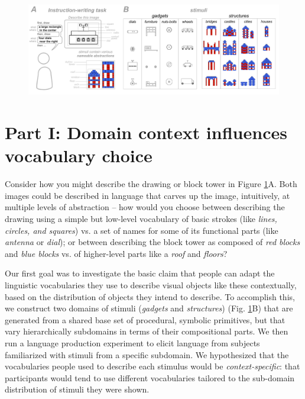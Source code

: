 \documentclass[10pt,letterpaper]{article}
\begin{document}
\begin{figure}
  \begin{center}
  \includegraphics[width=0.99\linewidth]{figures/task_fig_full.pdf}
  \caption{}
  \label{fig:task}
  \end{center}
  \end{figure}    

\section{Part I: Domain context influences vocabulary choice} \label{sec-part-i}
Consider how you might describe the drawing or block tower in Figure \ref{fig:task}A. Both images could be described in language that carves up the image, intuitively, at multiple levels of abstraction -- how would you choose between describing the drawing using a simple but low-level vocabulary of basic strokes (like \textit{lines, circles, and squares}) vs. a set of names for some of its functional parts (like \textit{antenna} or \textit{dial}); or between describing the block tower as composed of \textit{red blocks} and \textit{blue blocks} vs. of higher-level parts like a \textit{roof} and \textit{floors}?

Our first goal was to investigate the basic claim that people can adapt the linguistic vocabularies they use to describe visual objects like these contextually, based on the distribution of objects they intend to describe. To accomplish this, we construct two domains of stimuli (\textit{gadgets} and \textit{structures}) (Fig. \ref{fig:task}B) that are generated from a shared base set of procedural, symbolic primitives, but that vary hierarchically subdomains in terms of their compositional parts. We then run a language production experiment to elicit language from subjects familiarized with stimuli from a specific subdomain. We hypothesized that the vocabularies people used to describe each stimulus would be \textit{context-specific}: that participants would tend to use different vocabularies tailored to the sub-domain distribution of stimuli they were shown.
\end{document}
